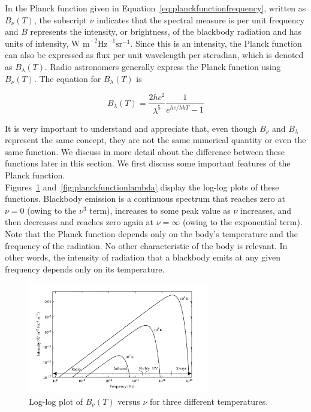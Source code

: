 In the Planck function given in Equation~\eqref{eq:planckfunctionfrequency}, written as $B_\nu(T)$, the subscript $\nu$ indicates that the spectral measure is per unit frequency and $B$ represents the intensity, or brightness, of the blackbody radiation and has units of intensity, \( \text{W m}^{-2} \text{Hz}^{-1} \text{sr}^{-1} \). Since this is an intensity, the Planck function can also be expressed as flux per unit wavelength per steradian, which is denoted as $B_\lambda(T)$. Radio astronomers generally express the Planck function using $B_\nu(T)$. The equation for $B_\lambda(T)$ is

\begin{equation}
	B_\lambda (T) = \frac{2hc^2}{\lambda^5} \frac{1}{e^{hc / \lambda k T} - 1}
	\label{eq:planckfunctionwavelength}
\end{equation}


It is very important to understand and appreciate that, even though \(B_\nu\) and \(B_\lambda\) represent the same concept, they are not the same numerical quantity or even the same function. We discuss in more detail about the difference between these functions later in this section. We first discuss some important features of the Planck function. \\

Figures~\ref{fig:planckfunctionnu} and~\ref{fig:planckfunctionlambda} display the log-log plots of these functions. Blackbody emission is a continuous spectrum that reaches zero at \(\nu = 0\) (owing to the \(\nu^3\) term), increases to some peak value as \(\nu\) increases, and then decreases and reaches zero again at \(\nu = \infty\) (owing to the exponential term). Note that the Planck function depends only on the body’s temperature and the frequency of the radiation. No other characteristic of the body is relevant. In other words, the intensity of radiation that a blackbody emits at any given frequency depends only on its temperature. \\

\begin{figure}[H]
	\centering
	\includegraphics[width=0.7\textwidth]{Images/B_nu_plot.png}
	\caption{Log-log plot of $B_{\nu}(T)$ versus $\nu$ for three different temperatures.}
	\label{fig:planckfunctionnu}
\end{figure}

